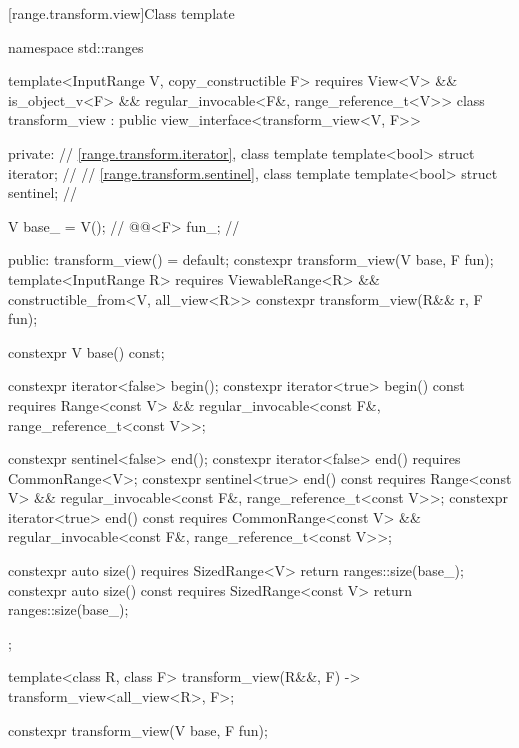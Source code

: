 [range.transform.view]{Class template }

\begin{codeblock}
namespace std::ranges {
  template<InputRange V, copy_constructible F>
    requires View<V> && is_object_v<F> &&
             regular_invocable<F&, range_reference_t<V>>
  class transform_view : public view_interface<transform_view<V, F>> {
  private:
    // \ref{range.transform.iterator}, class template 
    template<bool> struct iterator;             // \expos
    // \ref{range.transform.sentinel}, class template 
    template<bool> struct sentinel;             // \expos

    V base_ = V();                              // \expos
    @@<F> fun_;                    // \expos

  public:
    transform_view() = default;
    constexpr transform_view(V base, F fun);
    template<InputRange R>
      requires ViewableRange<R> && constructible_from<V, all_view<R>>
    constexpr transform_view(R&& r, F fun);

    constexpr V base() const;

    constexpr iterator<false> begin();
    constexpr iterator<true> begin() const
      requires Range<const V> &&
               regular_invocable<const F&, range_reference_t<const V>>;

    constexpr sentinel<false> end();
    constexpr iterator<false> end() requires CommonRange<V>;
    constexpr sentinel<true> end() const
      requires Range<const V> &&
               regular_invocable<const F&, range_reference_t<const V>>;
    constexpr iterator<true> end() const
      requires CommonRange<const V> &&
               regular_invocable<const F&, range_reference_t<const V>>;

    constexpr auto size() requires SizedRange<V> { return ranges::size(base_); }
    constexpr auto size() const requires SizedRange<const V>
    { return ranges::size(base_); }
  };

  template<class R, class F>
    transform_view(R&&, F) -> transform_view<all_view<R>, F>;
}
\end{codeblock}

%
\begin{itemdecl}
constexpr transform_view(V base, F fun);
\end{itemdecl}

